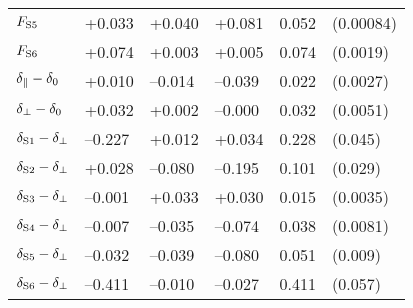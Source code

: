 \begin{table}[htbp]
\begin{tabular}{llllll}
    $\FS[5]$            &  +0.033    &  +0.040          &  +0.081          & 0.052  &  (0.00084)                   \\
    $\FS[6]$            &  +0.074    &  +0.003          &  +0.005          & 0.074  &  (0.0019)                    \\
    \hline
    $\delpar-\delzero$  &  +0.010    & --0.014          & --0.039          & 0.022  &  (0.0027)                    \\
    $\delperp-\delzero$ &  +0.032    &  +0.002          & --0.000          & 0.032  &  (0.0051)                    \\
    $\delS[1]-\delperp$ & --0.227    &  +0.012          &  +0.034          & 0.228  &  (0.045)                     \\
    $\delS[2]-\delperp$ &  +0.028    & --0.080          & --0.195          & 0.101  &  (0.029)                     \\
    $\delS[3]-\delperp$ & --0.001    &  +0.033          &  +0.030          & 0.015  &  (0.0035)                    \\
    $\delS[4]-\delperp$ & --0.007    & --0.035          & --0.074          & 0.038  &  (0.0081)                    \\
    $\delS[5]-\delperp$ & --0.032    & --0.039          & --0.080          & 0.051  &  (0.009)                     \\
    $\delS[6]-\delperp$ & --0.411    & --0.010          & --0.027          & 0.411  &  (0.057)                     \\
    \hline
  \end{tabular}
\end{table}

